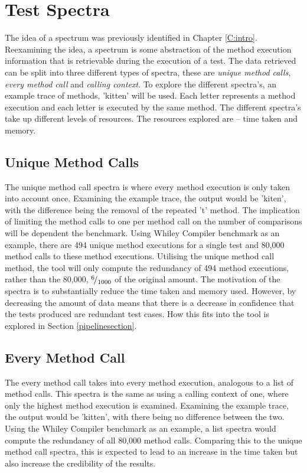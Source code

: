\section{Test Spectra}
\label{S:spectra}
The idea of a spectrum was previously identified in Chapter \ref{C:intro}. Reexamining the idea, a spectrum is some abstraction of the method execution information that is retrievable during the execution of a test. The data retrieved can be split into three different types of spectra, these are \textit{unique method calls}, \textit{every method call} and \textit{calling context}. To explore the different spectra's, an example trace of methods, 'kitten' will be used. Each letter represents a method execution and each letter is executed by the same method. The different spectra's take up different levels of resources. The resources explored are -- time taken and memory. 

\subsection{Unique Method Calls}
The unique method call spectra is where every method execution is only taken into account once. Examining the example trace, the output would be 'kiten', with the difference being the removal of the repeated 't' method. The implication of limiting the method calls to one per method call on the number of comparisons will be dependent the benchmark. Using Whiley Compiler benchmark as an example, there are 494 unique method executions for a single test and 80,000 method calls to these method executions. Utilising the unique method call method, the tool will only compute the redundancy of 494 method executions, rather than the 80,000, ${}^{6}\!/_{1000}$ of the original amount. The motivation of the spectra is to substantially reduce the time taken and memory used. However, by decreasing the amount of data means that there is a decrease in confidence that the tests produced are redundant test cases. How this fits into the tool is explored in Section \ref{pipelinesection}. 

\subsection{Every Method Call}
The every method call takes into every method execution, analogous to a list of method calls. This spectra is the same as using a calling context of one, where only the highest method execution is examined. Examining the example trace, the output would be 'kitten', with there being no difference between the two. Using the Whiley Compiler benchmark as an example, a list spectra would compute the redundancy of all 80,000 method calls. Comparing this to the unique method call spectra, this is expected to lead to an increase in the time taken but also increase the credibility of the results. 

